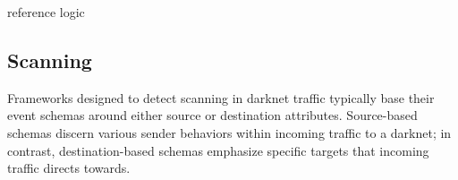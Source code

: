 \documentclass[manuscript,nonacm]{acmart}
\begin{document}


\vspace{0.25em}
 reference logic 



\subsection{Scanning}

Frameworks designed to detect scanning in darknet traffic typically base their event schemas around either source or destination attributes.
Source-based schemas discern various sender behaviors within incoming traffic to a darknet; in contrast, destination-based schemas emphasize specific targets that incoming traffic directs towards.
\vspace{0.25em}
\end{document}
